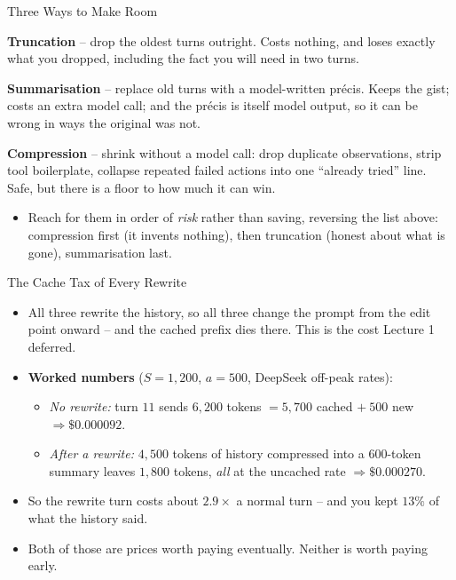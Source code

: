 \begin{frame}{Three Ways to Make Room}
\begin{rldefinition}
\textbf{Truncation} -- drop the oldest turns outright. Costs nothing, and loses exactly what you dropped, including the fact you will need in two turns.

\smallskip
\textbf{Summarisation} -- replace old turns with a model-written pr\'ecis. Keeps the gist; costs an extra model call; and the pr\'ecis is itself model output, so it can be wrong in ways the original was not.

\smallskip
\textbf{Compression} -- shrink without a model call: drop duplicate observations, strip tool boilerplate, collapse repeated failed actions into one ``already tried'' line. Safe, but there is a floor to how much it can win.
\end{rldefinition}
\pause
\begin{itemize}
  \item Reach for them in order of \emph{risk} rather than saving, reversing the list above: compression first (it invents nothing), then truncation (honest about what is gone), summarisation last.
\end{itemize}
\end{frame}

\begin{frame}{The Cache Tax of Every Rewrite}
\begin{itemize}
  \item All three rewrite the history, so all three change the prompt from the edit point onward -- and the cached prefix dies there. This is the cost Lecture 1 deferred.
  \pause
  \item \textbf{Worked numbers} ($S=1{,}200$, $a=500$, DeepSeek off-peak rates):
  \begin{itemize}
    \item \emph{No rewrite:} turn $11$ sends $6{,}200$ tokens $= 5{,}700$ cached $+\ 500$ new $\Rightarrow \$0.000092$.
    \item \emph{After a rewrite:} $4{,}500$ tokens of history compressed into a $600$-token summary leaves $1{,}800$ tokens, \emph{all} at the uncached rate $\Rightarrow \$0.000270$.
  \end{itemize}
  \pause
  \item So the rewrite turn costs about $2.9\times$ a normal turn -- and you kept $13\%$ of what the history said.
  \pause
  \item Both of those are prices worth paying eventually. Neither is worth paying early.
\end{itemize}
\end{frame}

